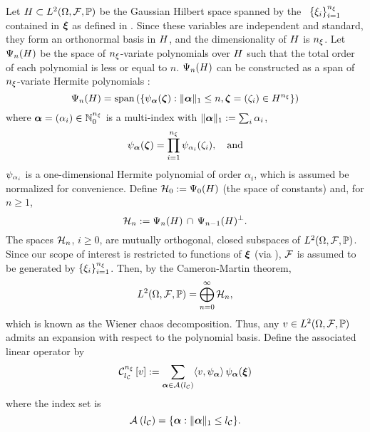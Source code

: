 Let $\hilbertSpace \subset \L{2}(\outcomes, \sigmaAlgebra, \probabilityMeasure)$ be the Gaussian Hilbert space \cite{janson1997} spanned by the \rvs\ $\{ \z_i \}_{i = 1}^\nvars$ contained in $\vz$ as defined in .
Since these variables are independent and standard, they form an orthonormal basis in $\hilbertSpace$, and the dimensionality of $\hilbertSpace$ is $\nvars$.
Let $\polynomialSpace_n(\hilbertSpace)$ be the space of $\nvars$-variate polynomials over $\hilbertSpace$ such that the total order of each polynomial is less or equal to $n$.
$\polynomialSpace_n(\hilbertSpace)$ can be constructed as a span of $\nvars$-variate Hermite polynomials \cite{maitre2010, eldred2008}:
\[
  \polynomialSpace_{n}(\hilbertSpace) = \hull{\left\{ \polynomial_{\multiindex}(\vh): \norm[1]{\multiindex} \leq n, \vh = (\h_i) \in \hilbertSpace^\nvars \right\}}
\]
where $\multiindex = (\alpha_i) \in \natural^\nvars$ is a multi-index with $\norm[1]{\multiindex} := \sum_i \alpha_i$,
\[
  \polynomial_{\multiindex}(\vh) = \prod_{i = 1}^\nvars \polynomial_{\alpha_i}(\h_i), \hspace{1em} \text{and}
\]
$\polynomial_{\alpha_i}$ is a one-dimensional Hermite polynomial of order $\alpha_i$, which is assumed be normalized for convenience.
Define $\chaosSpace_0 := \polynomialSpace_0(\hilbertSpace)$ (the space of constants) and, for $n \geq 1$,
\[
  \chaosSpace_n := \polynomialSpace_n(\hilbertSpace) \, \cap \, \polynomialSpace_{n - 1}(\hilbertSpace)^\perp.
\]
The spaces $\chaosSpace_n$, $i \geq 0$, are mutually orthogonal, closed subspaces of $\L{2}(\outcomes, \sigmaAlgebra, \probabilityMeasure)$.
Since our scope of interest is restricted to functions of $\vz$ (via ), $\sigmaAlgebra$ is assumed to be generated by $\{ \z_i \}_{i = 1}^\nvars$.
Then, by the Cameron-Martin theorem,
\[
  \L{2}(\outcomes, \sigmaAlgebra, \probabilityMeasure) = \bigoplus_{n = 0}^\infty \chaosSpace_n,
\]
which is known as the Wiener chaos decomposition.
Thus, any $\w \in \L{2}(\outcomes, \sigmaAlgebra, \probabilityMeasure)$ admits an expansion with respect to the polynomial basis.
Define the associated linear operator by
\begin{equation} \xelab{spectral-decomposition}
  \chaos{\nvars}{\nclevel}{\w} := \sum_{\multiindex \in \chaosMultiindexSet{\nclevel}} \innerProduct{\w, \polynomial_{\multiindex}} \, \polynomial_{\multiindex}(\vz)
\end{equation}
where the index set is
\begin{equation} \xelab{total-order-index-set}
  \chaosMultiindexSet{\nclevel} = \{ \multiindex: \norm[1]{\multiindex} \leq \nclevel \}.
\end{equation}
